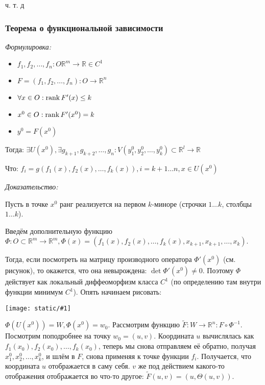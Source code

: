 \documentclass{article}
\def\image#1{\texttt{[image: static/\#1]}}
\begin{document}
ч. т. д

\subsubsection{Теорема о функциональной зависимости}
\textit{Формулировка:}

\begin{itemize}
    \item $f_1, f_2, \ldots, f_n: O \mathbb{R}^m \rightarrow \mathbb{R} \in C^1$
    \item $F = (f_1, f_2, \ldots, f_n): O \rightarrow \mathbb{R}^n$
    \item $\forall x \in O: \rank F'(x) \le k$
    \item $x^0 \in O: \rank F'(x^0) = k$
    \item $y^0 = F(x^0)$
\end{itemize}

Тогда: $\exists U(x^0), \exists g_{k + 1}, g_{k + 2}, \ldots, g_n: V(y^0_1, y^0_2, \ldots, y^0_k) \subset \mathbb{R}^l \rightarrow \mathbb{R}$

Что: $f_i = g(f_1(x), f_2(x), \ldots, f_k(x)), i = k + 1 \ldots n, x \in U(x^0)$

\textit{Доказательство:}

Пусть в точке $x^0$ ранг реализуется на первом $k$-миноре (строчки $1 \ldots k$, столбцы $1 \ldots k$).

Введём дополнительную функцию $\Phi: O \subset \mathbb{R}^m \rightarrow \mathbb{R}^m, \Phi(x) = (f_1(x), f_2(x), \ldots, f_k(x), x_{k + 1}, x_{k + 1}, \ldots, x_k)$.

Тогда, если посмотреть на матрицу производного оператора $\Phi'(x^0)$ (см. рисунок), то окажется, что она невырождена: $\det \Phi'(x^0) \neq 0$. Поэтому $\Phi$ действует как локальный диффеоморфизм класса $C^1$ (по определению там внутри функции минимум $C^1$). Опять начинаем рисовать:

\image{func_zav.png}

$\Phi(U(x^0)) = W, \Phi(x^0) = w_0$. Рассмотрим функцию $\widetilde{F}: W \rightarrow \mathbb{R}^n: F \circ \Phi^{-1}$. Посмотрим поподробнее на точку $w_0 = (u, v)$. Координата $u$ вычислялась как $f_1(x_0), f_2(x_0), \ldots, f_k(x_0)$, теперь мы снова отправляем её обратно, получая $x^0_1, x^0_2, \ldots, x^0_k$, и шлём в $F$, снова применяя к точке функции $f_i$. Получается, что координата $u$ отображается в саму себя. $v$ же под действием какого-то отображения отображается во что-то другое: $\widetilde{F}(u, v) = (u, \Theta(u, v))$.
\end{document}

